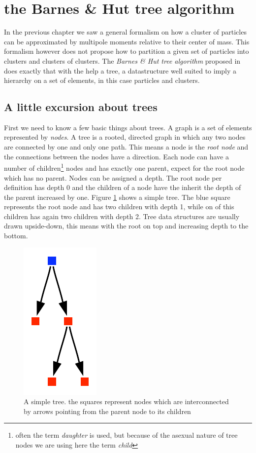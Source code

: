 
\section{the Barnes \& Hut tree algorithm}
In the previous chapter we saw a general formalism on how a cluster of particles can be approximated by multipole moments relative to their center of mass. This formalism however does not propose how to partition a given set of particles into clusters and clusters of clusters. The \emph{Barnes \& Hut tree algorithm} proposed in \cite{1986Natur.324..446B} does exactly that with the help a tree, a datastructure well suited to imply a hierarchy on a set of elements, in this case particles and clusters.

\subsection{A little excursion about trees}
First we need to know a few basic things about trees. A graph is a set of elements represented by \emph{nodes}. A tree is a rooted, directed graph in which any two nodes are connected by one and only one path. This means a node is the \emph{root node} and the connections between the nodes have a direction. Each node can have a number of children\footnote{often the term \emph{daughter} is used, but because of the asexual nature of tree nodes we are using here the term \emph{child}} 
nodes and has exactly one parent, expect for the root node which has no parent. Nodes can be assigned a depth. The root node per definition has depth $0$ and the children of a node have the inherit the depth of the parent increased by one. Figure \ref{fig:simpletree} shows a simple tree. The blue square represents the root node and has two children with depth 1, while on of this children has again two children with depth 2. Tree data structures are usually drawn upside-down, this means with the root on top and increasing depth to the bottom.

\begin{figure}[htbp]
\begin{center}
\includegraphics{simpletree.pdf}
\caption{A simple tree. the squares represent nodes which are interconnected by arrows pointing from the parent node to its children}
\label{fig:simpletree}
\end{center}
\end{figure}

